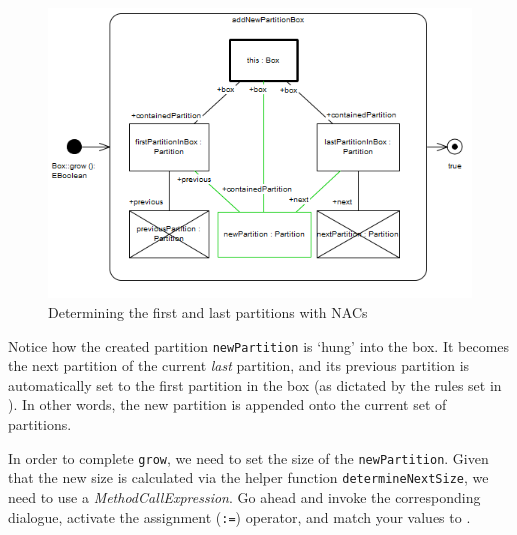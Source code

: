 \begin{stepbystep}
\begin{figure}[htbp]
\begin{center}
  \includegraphics[width=\textwidth]{../../org.moflon.doc.handbook.03_storyDiagrams/08_growBox/visGBImages/ea_NacComplete} 
  \caption{Determining the first and last partitions with NACs}  
  \label{ea:sdm_firstLastPartitions}
\end{center}
\end{figure}
 
\item Notice how the created partition \texttt{newPartition} is `hung' into the box. It becomes the next partition of the current
\emph{last} partition, and its previous partition is automatically set to the first partition in the box (as dictated by the rules set in
). In other words, the new partition is appended onto the current set of partitions.

\item In order to complete \texttt{grow}, we need to set the size of the \texttt{newPartition}. Given that the new size is calculated
via the helper function \texttt{det\-er\-mine\-Next\-Size}, we need to use a \emph{MethodCallExpression}. Go ahead and invoke the corresponding dialogue,
activate the assignment (\texttt{:=}) operator, and match your values to .
 

\end{stepbystep}
